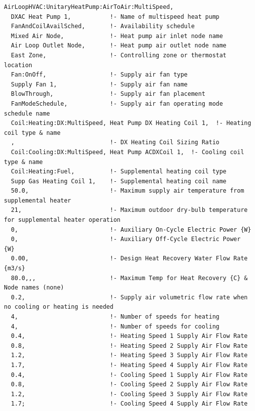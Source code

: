 \begin{lstlisting}
AirLoopHVAC:UnitaryHeatPump:AirToAir:MultiSpeed,
  DXAC Heat Pump 1,           !- Name of multispeed heat pump
  FanAndCoilAvailSched,       !- Availability schedule
  Mixed Air Node,             !- Heat pump air inlet node name
  Air Loop Outlet Node,       !- Heat pump air outlet node name
  East Zone,                  !- Controlling zone or thermostat location
  Fan:OnOff,                  !- Supply air fan type
  Supply Fan 1,               !- Supply air fan name
  BlowThrough,                !- Supply air fan placement
  FanModeSchedule,            !- Supply air fan operating mode schedule name
  Coil:Heating:DX:MultiSpeed, Heat Pump DX Heating Coil 1,  !- Heating coil type & name
  ,                           !- DX Heating Coil Sizing Ratio
  Coil:Cooling:DX:MultiSpeed, Heat Pump ACDXCoil 1,  !- Cooling coil type & name
  Coil:Heating:Fuel,          !- Supplemental heating coil type
  Supp Gas Heating Coil 1,    !- Supplemental heating coil name
  50.0,                       !- Maximum supply air temperature from supplemental heater
  21,                         !- Maximum outdoor dry-bulb temperature for supplemental heater operation
  0,                          !- Auxiliary On-Cycle Electric Power {W}
  0,                          !- Auxiliary Off-Cycle Electric Power {W}
  0.00,                       !- Design Heat Recovery Water Flow Rate {m3/s}
  80.0,,,                     !- Maximum Temp for Heat Recovery {C} & Node names (none)
  0.2,                        !- Supply air volumetric flow rate when no cooling or heating is needed
  4,                          !- Number of speeds for heating
  4,                          !- Number of speeds for cooling
  0.4,                        !- Heating Speed 1 Supply Air Flow Rate
  0.8,                        !- Heating Speed 2 Supply Air Flow Rate
  1.2,                        !- Heating Speed 3 Supply Air Flow Rate
  1.7,                        !- Heating Speed 4 Supply Air Flow Rate
  0.4,                        !- Cooling Speed 1 Supply Air Flow Rate
  0.8,                        !- Cooling Speed 2 Supply Air Flow Rate
  1.2,                        !- Cooling Speed 3 Supply Air Flow Rate
  1.7;                        !- Cooling Speed 4 Supply Air Flow Rate


\end{lstlisting}
